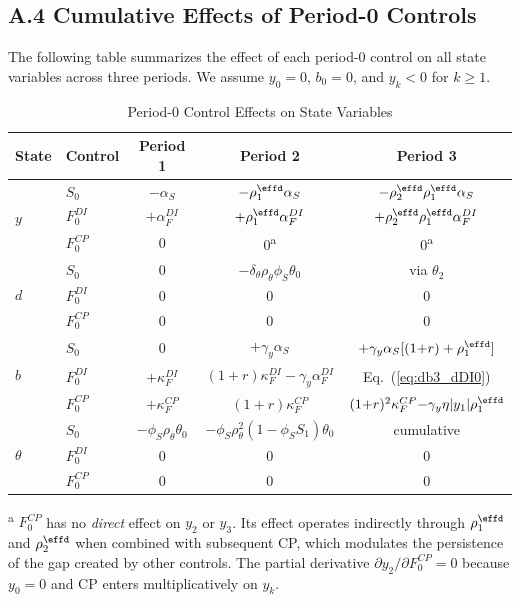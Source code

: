 \documentclass[12pt, a4paper]{article}
\begin{document}
\subsection*{A.4 Cumulative Effects of Period-0 Controls}

The following table summarizes the effect of each period-0 control on all state variables across three periods. We assume $y_0 = 0$, $b_0 = 0$, and $y_k < 0$ for $k \geq 1$.

\begin{table}[h]
\centering
\caption{Period-0 Control Effects on State Variables}
\label{tab:control_effects}
\small
\begin{tabular}{@{}llccc@{}}
\toprule
State & Control & Period 1 & Period 2 & Period 3 \\
\midrule
\multirow{3}{*}{$y$}
  & $S_0$ & $-\alpha_S$ & $-\rho_1^{\effd} \alpha_S$ & $-\rho_2^{\effd}\rho_1^{\effd} \alpha_S$ \\
  & $F_0^{DI}$ & $+\alpha_F^{DI}$ & $+\rho_1^{\effd} \alpha_F^{DI}$ & $+\rho_2^{\effd}\rho_1^{\effd} \alpha_F^{DI}$ \\
  & $F_0^{CP}$ & $0$ & $0$\textsuperscript{a} & $0$\textsuperscript{a} \\
\midrule
\multirow{3}{*}{$d$}
  & $S_0$ & $0$ & $-\delta_\theta \rho_\theta \phi_S \theta_0$ & via $\theta_2$ \\
  & $F_0^{DI}$ & $0$ & $0$ & $0$ \\
  & $F_0^{CP}$ & $0$ & $0$ & $0$ \\
\midrule
\multirow{3}{*}{$b$}
  & $S_0$ & $0$ & $+\gamma_y \alpha_S$ & $+\gamma_y \alpha_S[(1{+}r) + \rho_1^{\effd}]$ \\
  & $F_0^{DI}$ & $+\kappa_F^{DI}$ & $(1{+}r)\kappa_F^{DI} {-} \gamma_y \alpha_F^{DI}$ & Eq.~(\ref{eq:db3_dDI0}) \\
  & $F_0^{CP}$ & $+\kappa_F^{CP}$ & $(1{+}r)\kappa_F^{CP}$ & $(1{+}r)^2\kappa_F^{CP} {-} \gamma_y \eta|y_1|\rho_1^{\effd}$ \\
\midrule
\multirow{3}{*}{$\theta$}
  & $S_0$ & $-\phi_S \rho_\theta \theta_0$ & $-\phi_S \rho_\theta^2(1{-}\phi_S S_1)\theta_0$ & cumulative \\
  & $F_0^{DI}$ & $0$ & $0$ & $0$ \\
  & $F_0^{CP}$ & $0$ & $0$ & $0$ \\
\bottomrule
\end{tabular}

\medskip
\footnotesize
\textsuperscript{a} $F_0^{CP}$ has no \textit{direct} effect on $y_2$ or $y_3$. Its effect operates indirectly through $\rho_1^{\effd}$ and $\rho_2^{\effd}$ when combined with subsequent CP, which modulates the persistence of the gap created by other controls. The partial derivative $\partial y_2 / \partial F_0^{CP} = 0$ because $y_0 = 0$ and CP enters multiplicatively on $y_k$.
\end{table}
\end{document}

